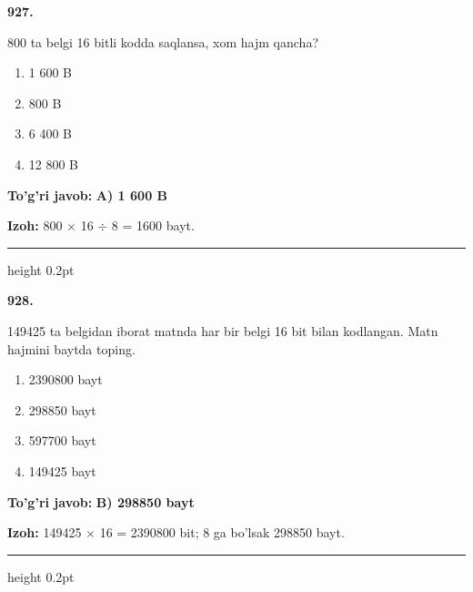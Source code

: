 \documentclass[10pt,a4paper,oneside]{article}
\begin{document}
\noindent\textbf{\color{ink}927.}
\par
800 ta belgi 16 bitli kodda saqlansa, xom hajm qancha?
\begin{enumerate}[label=\Alph*),leftmargin=9mm]
\item 1 600 B
\item 800 B
\item 6 400 B
\item 12 800 B
\end{enumerate}
\begin{tcolorbox}[enhanced,breakable,colback=teal!4,colframe=teal!50!black,boxrule=0.5pt,arc=1.1mm,left=3mm,right=3mm,top=1.7mm,bottom=1.7mm,before skip=2mm,after skip=2mm]
\textbf{\color{teal}To'g'ri javob:} \textbf{A) 1 600 B}
\par\smallskip
\textbf{Izoh:} 800 \ensuremath{\times} 16 \ensuremath{\div} 8 = 1600 bayt.
\end{tcolorbox}
\vspace{2mm}\hrule height 0.2pt \vspace{3mm}

\noindent\textbf{\color{ink}928.}
\par
149425 ta belgidan iborat matnda har bir belgi 16 bit bilan kodlangan. Matn hajmini baytda toping.
\begin{enumerate}[label=\Alph*),leftmargin=9mm]
\item 2390800 bayt
\item 298850 bayt
\item 597700 bayt
\item 149425 bayt
\end{enumerate}
\begin{tcolorbox}[enhanced,breakable,colback=teal!4,colframe=teal!50!black,boxrule=0.5pt,arc=1.1mm,left=3mm,right=3mm,top=1.7mm,bottom=1.7mm,before skip=2mm,after skip=2mm]
\textbf{\color{teal}To'g'ri javob:} \textbf{B) 298850 bayt}
\par\smallskip
\textbf{Izoh:} 149425 \ensuremath{\times} 16 = 2390800 bit; 8 ga bo'lsak 298850 bayt.
\end{tcolorbox}
\vspace{2mm}\hrule height 0.2pt \vspace{3mm}
\end{document}
